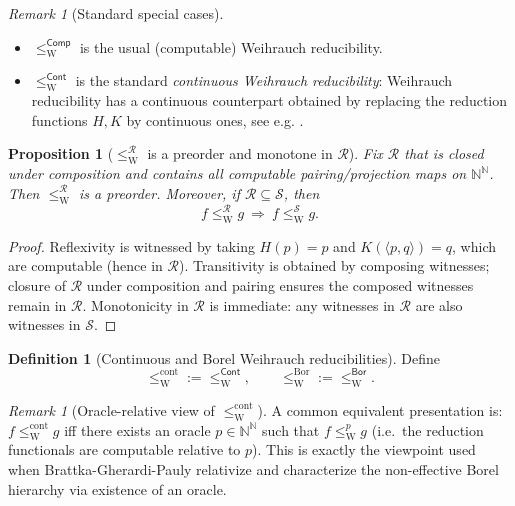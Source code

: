 \documentclass{lmcs} %
\theoremstyle{plain}
\theoremstyle{plain}
\newtheorem{proposition}[theorem]{Proposition}
\theoremstyle{definition}
\newtheorem{definition}[theorem]{Definition}
\theoremstyle{remark}
\newtheorem{remark}[theorem]{Remark}
\theoremstyle{definition}
\theoremstyle{remark}
\numberwithin{equation}{section}
\newcommand{\N}{\mathbb{N}}
\newcommand{\Baire}{\N^\N}
\newcommand{\Bor}{\mathsf{Bor}}
\newcommand{\Cont}{\mathsf{Cont}}
\newcommand{\Comp}{\mathsf{Comp}}
\begin{document}
\begin{remark}[Standard special cases]
\hspace{1mm}
\begin{itemize}
\item $\le_{\mathrm W}^{\Comp}$ is the usual (computable) Weihrauch reducibility.
\item $\le_{\mathrm W}^{\Cont}$ is the standard \textit{continuous Weihrauch reducibility}: Weihrauch reducibility has a continuous counterpart obtained by replacing the reduction functions $H,K$ by continuous ones, see e.g. \cite{brattka2011weihrauch}.
\end{itemize}
\end{remark}

\begin{proposition}[$\le_{\mathrm W}^{\mathcal{R}}$ is a preorder and monotone in $\mathcal{R}$]\label{prop:R-weihrauch-preorder}
Fix $\mathcal{R}$ that is closed under composition and contains all computable pairing/projection maps on $\Baire$.
Then $\le_{\mathrm W}^{\mathcal{R}}$ is a preorder.
Moreover, if $\mathcal{R}\subseteq\mathcal{S}$, then
\[
f \le_{\mathrm W}^{\mathcal{R}} g \ \Longrightarrow\ f \le_{\mathrm W}^{\mathcal{S}} g.
\]
\end{proposition}

\begin{proof}
Reflexivity is witnessed by taking $H(p)=p$ and $K(\langle p,q\rangle)=q$, which are computable (hence in $\mathcal{R}$).
Transitivity is obtained by composing witnesses; closure of $\mathcal{R}$ under composition and pairing ensures
the composed witnesses remain in $\mathcal{R}$.
Monotonicity in $\mathcal{R}$ is immediate: any witnesses in $\mathcal{R}$ are also witnesses in $\mathcal{S}$.
\end{proof}

\begin{definition}[Continuous and Borel Weihrauch reducibilities]\label{def:cont-borel-weihrauch}
Define
\[
\le_{\mathrm W}^{\mathrm{cont}} := \le_{\mathrm W}^{\Cont},
\qquad
\le_{\mathrm W}^{\mathrm{Bor}} := \le_{\mathrm W}^{\Bor}.
\]
\end{definition}

\begin{remark}[Oracle-relative view of $\le_{\mathrm W}^{\mathrm{cont}}$]
A common equivalent presentation is: $f\le_{\mathrm W}^{\mathrm{cont}} g$ iff there exists an oracle
$p\in\Baire$ such that $f\le_{\mathrm W}^{p} g$ (i.e.\ the reduction functionals are computable relative to $p$).
This is exactly the viewpoint used when Brattka-Gherardi-Pauly relativize \cite[Theorem 6.5]{brattka2021weihrauch} and characterize the non-effective Borel hierarchy via existence of an oracle.
\end{remark}
\end{document}
